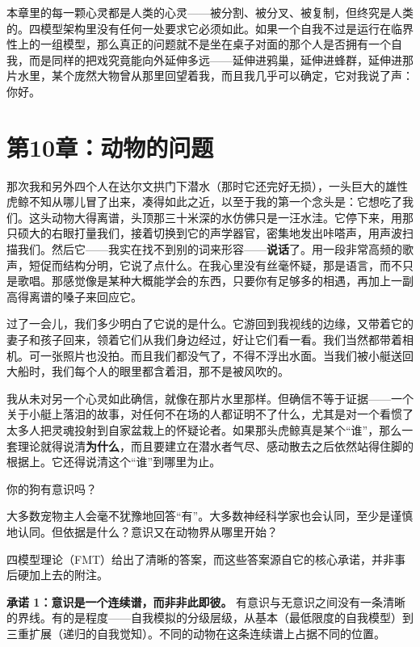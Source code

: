 \documentclass[11pt, twoside, openright]{book}
\begin{document}
本章里的每一颗心灵都是人类的心灵------被分割、被分叉、被复制，但终究是人类的。四模型架构里没有任何一处要求它必须如此。如果一个自我不过是运行在临界性上的一组模型，那么真正的问题就不是坐在桌子对面的那个人是否拥有一个自我，而是同样的把戏究竟能向外延伸多远------延伸进鸦巢，延伸进蜂群，延伸进那片水里，某个庞然大物曾从那里回望着我，而且我几乎可以确定，它对我说了声：你好。


\chapter*{第10章：动物的问题}

那次我和另外四个人在达尔文拱门下潜水（那时它还完好无损），一头巨大的雄性虎鲸不知从哪儿冒了出来，凑得如此之近，以至于我的第一个念头是：它想吃了我们。这头动物大得离谱，头顶那三十米深的水仿佛只是一汪水洼。它停下来，用那只硕大的右眼打量我们，接着切换到它的声学器官，密集地发出咔嗒声，用声波扫描我们。然后它------我实在找不到别的词来形容------\textbf{说话}了。用一段非常高频的歌声，短促而结构分明，它说了点什么。在我心里没有丝毫怀疑，那是语言，而不只是歌唱。那感觉像是某种大概能学会的东西，只要你有足够多的相遇，再加上一副高得离谱的嗓子来回应它。

过了一会儿，我们多少明白了它说的是什么。它游回到我视线的边缘，又带着它的妻子和孩子回来，领着它们从我们身边经过，好让它们看一看。我们当然都带着相机。可一张照片也没拍。而且我们都没气了，不得不浮出水面。当我们被小艇送回大船时，我们每个人的眼里都含着泪，那不是被风吹的。

我从未对另一个心灵如此确信，就像在那片水里那样。但确信不等于证据------一个关于小艇上落泪的故事，对任何不在场的人都证明不了什么，尤其是对一个看惯了太多人把灵魂投射到自家盆栽上的怀疑论者。如果那头虎鲸真是某个“谁”，那么一套理论就得说清\textbf{为什么}，而且要建立在潜水者气尽、感动散去之后依然站得住脚的根据上。它还得说清这个“谁”到哪里为止。

你的狗有意识吗？

大多数宠物主人会毫不犹豫地回答“有”。大多数神经科学家也会认同，至少是谨慎地认同。但依据是什么？意识又在动物界从哪里开始？

四模型理论（FMT）给出了清晰的答案，而这些答案源自它的核心承诺，并非事后硬加上去的附注。

\textbf{承诺 1：意识是一个连续谱，而非非此即彼。} 有意识与无意识之间没有一条清晰的界线。有的是程度------自我模拟的分级层级，从基本（最低限度的自我模型）到三重扩展（递归的自我觉知）。不同的动物在这条连续谱上占据不同的位置。
\end{document}
